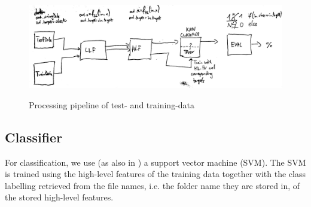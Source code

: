 \documentclass[10pt,twocolumn,letterpaper]{article}
\begin{document}
\begin{figure}
	\begin{center}
		

	\includegraphics[width=\textwidth]{img/pipeline}
	\label{fig:pipeline}
	\caption{Processing pipeline of test- and training-data}
		\end{center}
\end{figure}

\subsection{Classifier}
For classification, we use (as also in \cite{indoorScenes}) a support vector machine (SVM). The SVM is trained using the high-level features of the training data together with the class labelling retrieved from the file names, i.e. the folder name they are stored in, of the stored high-level features.




{\small


}
\end{document}
